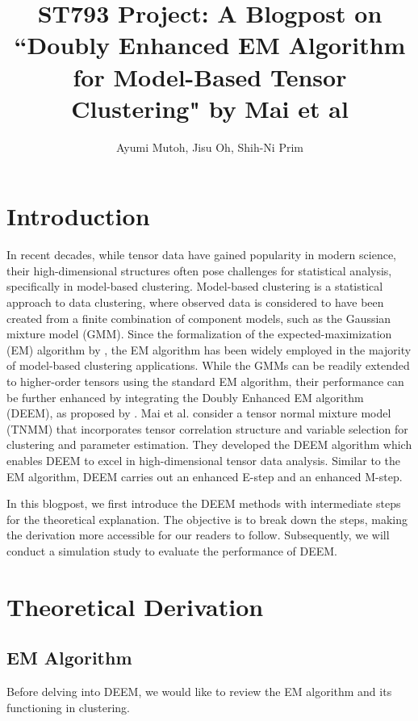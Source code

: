 \documentclass[11pt]{article}
\title{ST793 Project: A Blogpost on ``Doubly Enhanced EM Algorithm for Model-Based Tensor Clustering" by Mai et al}
\author{Ayumi Mutoh, Jisu Oh, Shih-Ni Prim}
\begin{document}
\maketitle

\section{Introduction}

In recent decades, while tensor data have gained popularity in modern science, their high-dimensional structures often pose challenges for statistical analysis, specifically in model-based clustering. Model-based clustering is a statistical approach to data clustering, where observed data is considered to have been created from a finite combination of component models, such as the Gaussian mixture model (GMM). Since the formalization of the expected-maximization (EM) algorithm by \cite{dempster1977EM}, the EM algorithm has been widely employed in the majority of model-based clustering applications. While the GMMs can be readily extended to higher-order tensors using the standard EM algorithm, their performance can be further enhanced by integrating the Doubly Enhanced EM algorithm (DEEM), as proposed by \cite{mai2022DEEM}. Mai et al. consider a tensor normal mixture model (TNMM) that incorporates tensor correlation structure and variable selection for clustering and parameter estimation. They developed the DEEM algorithm which enables DEEM to excel in high-dimensional tensor data analysis. Similar to the EM algorithm, DEEM carries out an enhanced E-step and an enhanced M-step. 

In this blogpost, we first introduce the DEEM methods with intermediate
steps for the theoretical explanation. The objective is to break down the steps, making the derivation more accessible for our readers to follow. Subsequently, we will conduct a simulation study to evaluate the performance of DEEM.

 
\section{Theoretical Derivation}
\subsection{EM Algorithm}
Before delving into DEEM, we would like to review the EM algorithm and its functioning in clustering.
\end{document}
